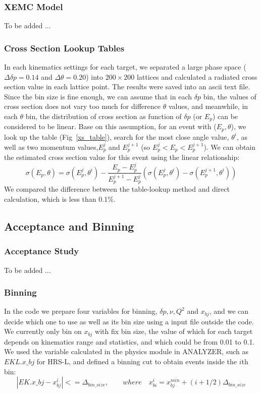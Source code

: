 \documentclass[a4paper,18.pt]{article}
\begin{document}
\subsubsection{XEMC Model} 

 To be added ...

\subsubsection{Cross Section Lookup Tables} 

 In each kinematics settings for each target, we separated a large phase space ($\Delta\delta p=0.14$ and $\Delta\theta=0.20$) into $200 \times 200$ lattices and calculated a radiated cross section value in each lattice point. The results were saved into an ascii text file. Since the bin size is fine enough, we can assume that in each $\delta p$ bin, the values of cross section does not vary too much for difference $\theta$ values, and meanwhile, in each $\theta$ bin, the distribution of cross section as function of $\delta p$ (or $E_{p}$) can be considered to be linear. Base on this assumption, for an event with ($E_{p}, \theta$), we look up the table (Fig~\ref{xs_table}), search for the most close angle value, $\theta^{i}$, as well as two momentum values,$E_{p}^{j}$ and $E_{p}^{j+1}$ (so $E_{p}^{j}<E_{p}<E_{p}^{j+1}$). We can obtain the estimated cross section value for this event using the linear relationship:
\begin{equation}
 \sigma(E_{p},\theta) = \sigma(E_{p}^{j},\theta^{i}) - \frac{E_{p}-E_{p}^{j}}{E_{p}^{j+1}-E_{p}^{j}}(\sigma(E_{p}^{j},\theta^{i})-\sigma(E_{p}^{j+1},\theta^{i}))
\end{equation}
We compared the difference between the table-lookup method and direct calculation, which is less than 0.1\%. 

\subsection{Acceptance and Binning}

\subsubsection{Acceptance Study}
To be added ...

\subsubsection{Binning}

In the code we prepare four variables for binning, $\delta p, \nu, Q^{2}$ and $x_{bj}$, and we can decide which one to use as well as its bin size using a input file outside the code.  We currently only bin on $x_{bj}$ with fix bin size, the value of which for each target depends on kinematics range and statistics, and which could be from 0.01 to 0.1. We used the variable calculated in the physics module in ANALYZER, such as $EKL.x\_bj$ for HRS-L, and defined a binning cut to obtain events inside the $i$th bin:
\begin{equation*}
  |EK.x\_bj - x_{bj}^{i}| <= \Delta_{bin\_size}, \qquad where \quad x_{bi}^{i} = x_{bj}^{min} + (i+1/2)\Delta_{bin\_size}
\end{equation*}
\end{document}
